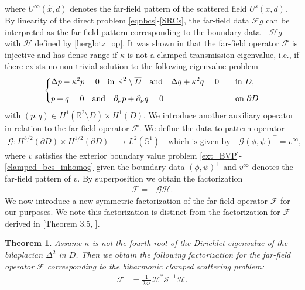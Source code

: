 \documentclass{article}
\newtheorem{Theorem}{Theorem}[section]
\begin{document}
where $U^\infty(\hat x,d)$ denotes the far-field pattern of the scattered
field $U^s(x,d)$.  By linearity of the direct problem \eqref{eqnbcs}-\eqref{SRCs}, the far-field data $\mathcal Fg$ can be interpreted as the far-field pattern corresponding to the boundary data $-\mathcal Hg$ with $\mathcal H$ defined by \eqref{herglotz_op}. It was shown in \cite{HarrisLiOzochiawaeze2026} that the far-field operator $\mathcal F$ is injective and has dense range if $\kappa$ is not a clamped transmission eigenvalue, i.e., if there exists no non-trivial solution to the following eigenvalue problem 
\begin{align}\label{eigvalue_problem}
\begin{dcases}
\Delta p-\kappa^2p=0 \quad \text{in } \mathbb R^2\setminus\overline D \quad \text{and}\quad \Delta q+\kappa^2q=0 &\quad \text{in } D, \\[2mm]
p+q=0 \quad \text{and}\quad \partial_\nu p+\partial_\nu q=0 &\quad \text{on } \partial D 
\end{dcases}
\end{align}
with $(p,q)\in H^1(\mathbb R^2\setminus\overline D)\times H^1(D)$. We introduce another auxiliary operator in relation to the far-field operator $\mathcal F$. We define the data-to-pattern operator
\begin{align}\label{G_operator}
\mathcal G : H^{3/2}(\partial D)\times H^{1/2}(\partial D) &\to L^2(\mathbb S^1) \quad \text{which is given by}\quad \mathcal G(\phi,\psi)^\top=v^{\infty},
\end{align}
where $v$ satisfies the exterior boundary value problem \eqref{ext_BVP}-\eqref{clamped_bcs_inhomog} given the boundary data $(\phi,\psi)^\top$ and $v^\infty$ denotes the
far-field pattern of $v$. By superposition we obtain the factorization 
\begin{align}
\mathcal F=-\mathcal G\mathcal H.
\end{align}
 We now introduce a new symmetric factorization of the far-field operator $\mathcal F$ for our purposes. We note this factorization is distinct from the factorization for $\mathcal F$ derived in [Theorem 3.5, \cite{Zhu2026}].
\begin{Theorem}
    Assume $\kappa$ is not the fourth root of the Dirichlet eigenvalue of the bilaplacian $\Delta^2$ in $D$. Then we obtain the following factorization for the far-field operator $\mathcal F$ corresponding to the biharmonic clamped scattering problem:
    \begin{align}\label{symm_fac2}
        \mathcal F&=\frac{1}{2\kappa^2}\mathcal H^{*}\mathcal S^{-1}\mathcal H.
    \end{align}
\end{Theorem}
\end{document}
